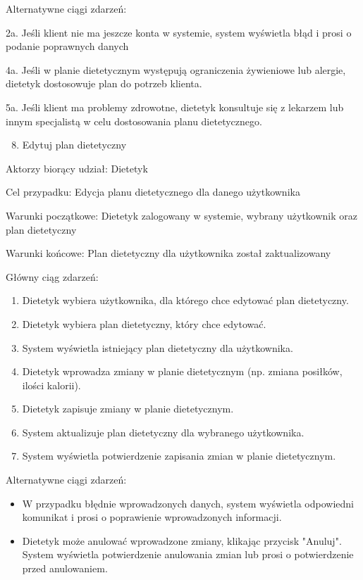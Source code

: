 \documentclass[
]{article}
\providecommand{\tightlist}{%
  \setlength{\itemsep}{0pt}\setlength{\parskip}{0pt}}
\begin{document}
{Alternatywne ciągi zdarzeń:}

{2a. Jeśli klient nie ma jeszcze konta w systemie, system wyświetla błąd
i prosi o podanie poprawnych danych}

{4a. Jeśli w planie dietetycznym występują ograniczenia żywieniowe lub
alergie, dietetyk dostosowuje plan do potrzeb klienta.}

{5a. Jeśli klient ma problemy zdrowotne, dietetyk konsultuje się z
lekarzem lub innym specjalistą w celu dostosowania planu dietetycznego.}

{}

\begin{enumerate}
\setcounter{enumi}{7}
\tightlist
\item
  {Edytuj plan dietetyczny}
\end{enumerate}

{Aktorzy biorący udział: Dietetyk}

{Cel przypadku: Edycja planu dietetycznego dla danego użytkownika}

{Warunki początkowe: Dietetyk zalogowany w systemie, wybrany użytkownik
oraz plan dietetyczny}

{Warunki końcowe: Plan dietetyczny dla użytkownika został
zaktualizowany}

{Główny ciąg zdarzeń:}

\begin{enumerate}
\tightlist
\item
  {Dietetyk wybiera użytkownika, dla którego chce edytować plan
  dietetyczny.}
\item
  {Dietetyk wybiera plan dietetyczny, który chce edytować.}
\item
  {System wyświetla istniejący plan dietetyczny dla użytkownika.}
\item
  {Dietetyk wprowadza zmiany w planie dietetycznym (np. zmiana posiłków,
  ilości kalorii).}
\item
  {Dietetyk zapisuje zmiany w planie dietetycznym.}
\item
  {System aktualizuje plan dietetyczny dla wybranego użytkownika.}
\item
  {System wyświetla potwierdzenie zapisania zmian w planie
  dietetycznym.}
\end{enumerate}

{Alternatywne ciągi zdarzeń:}

\begin{itemize}
\tightlist
\item
  {W przypadku błędnie wprowadzonych danych, system wyświetla odpowiedni
  komunikat i prosi o poprawienie wprowadzonych informacji.}
\item
  {Dietetyk może anulować wprowadzone zmiany, klikając przycisk
  "Anuluj". System wyświetla potwierdzenie anulowania zmian lub prosi o
  potwierdzenie przed anulowaniem.}
\end{itemize}
\end{document}
